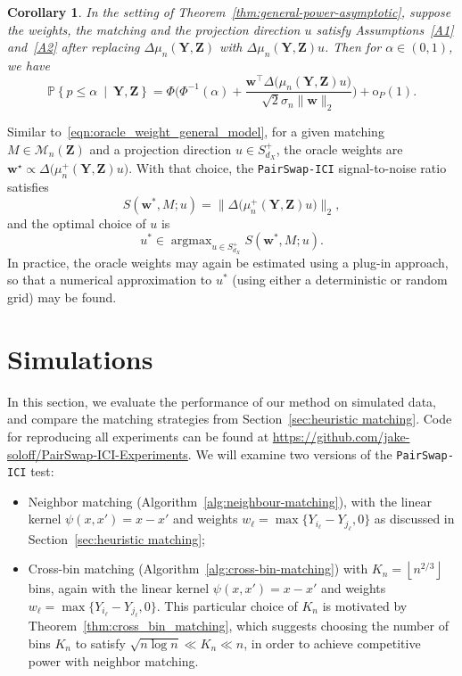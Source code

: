 \documentclass[12pt]{article}
\newtheorem{corollary}[theorem]{Corollary}
\newcommand{\PPst}[2]{\mathbb{P}\left\{{#1}\  \middle| \ {#2}\right\}}
\DeclareMathOperator*{\argmax}{argmax}
\newcommand{\bY}{\mathbf{Y}}
\newcommand{\bZ}{\mathbf{Z}}
\newcommand{\bw}{\mathbf{w}}
\begin{document}
\begin{corollary}\label{thm:general-power-asymptotic_multivariate}
    In the setting of Theorem~\ref{thm:general-power-asymptotic}, suppose the weights, the matching and the projection direction $u$ satisfy Assumptions~\ref{A1} and~\ref{A2} after replacing $\Delta\mu_n(\bY,\bZ)$ with $\Delta\mu_n(\bY,\bZ)u$.  Then for $\alpha \in (0,1)$, we have
    \[
    \PPst{p\leq \alpha}{\bY,\bZ}=\Phi\biggl(\Phi^{-1}(\alpha)+\frac{\bw^\top \Delta\bigl(\mu_n(\bY,\bZ)u\bigr)}{\sqrt{2}\sigma_n\|\bw\|_2}\biggr)+\mathrm{o}_P(1).
    \]
\end{corollary}

Similar to~\eqref{eqn:oracle_weight_general_model}, for a given matching $M\in \mathcal{M}_n(\bZ)$ and a projection direction $u\in S^{+}_{d_X}$, the oracle weights are 
$\bw^\star \propto \Delta \bigl(\mu_n^+(\bY,\bZ) u\bigr)$.  With that choice, the \texttt{PairSwap-ICI} signal-to-noise ratio satisfies
\[
S(\bw^*,M;u) = \bigl\|\Delta\bigl(\mu_n^+(\bY,\bZ)u\bigr)\bigr\|_2,
\]
and the optimal choice of $u$ is 
\[
u^* \in \argmax_{u \in S_{d_X}^+} S(\bw^*,M;u).
\]
In practice, the oracle weights may again be estimated using a plug-in approach, so that a numerical approximation to $u^*$ (using either a deterministic or random grid) may be found.



\section{Simulations}\label{sec:simulations}

In this section, we evaluate the performance of our method on simulated data, and compare the matching strategies from Section~\ref{sec:heuristic matching}. 
Code for reproducing all experiments can be found at \url{https://github.com/jake-soloff/PairSwap-ICI-Experiments}. 
We will examine two versions of the \textnormal{\texttt{PairSwap-ICI}} test:
\begin{itemize}
    \item Neighbor matching (Algorithm~\ref{alg:neighbour-matching}), with the linear kernel $\psi(x,x') = x-x'$ and weights $w_\ell = \max\{Y_{i_\ell} - Y_{j_\ell},0\}$ as discussed in Section~\ref{sec:heuristic matching};
    \item Cross-bin matching (Algorithm~\ref{alg:cross-bin-matching}) with $K_n=\left\lfloor n^{2/3}\right\rfloor$ bins, again with the linear kernel $\psi(x,x') = x-x'$ and weights $w_\ell = \max\{Y_{i_\ell} - Y_{j_\ell},0\}$. This particular choice of $K_n$ is motivated by Theorem~\ref{thm:cross_bin_matching}, which suggests choosing the number of bins $K_n$ to satisfy $\sqrt{n \log n}\ll K_n \ll n$, in order to achieve competitive power with neighbor matching. 
\end{itemize}
\end{document}
